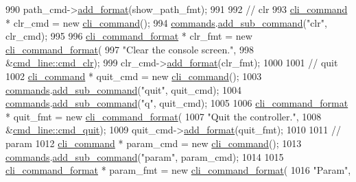 \begin{DoxyCode}
990     path\_cmd->\hyperlink{classcli__command_aa9ec38e761644d946f8db2b920e39921}{add\_format}(show\_path\_fmt);
991 
992     \textcolor{comment}{// clr}
993     \hyperlink{classcli__command}{cli\_command} * clr\_cmd = \textcolor{keyword}{new} \hyperlink{classcli__command}{cli\_command}();
994     \hyperlink{classcmd__line_ae4fea670c2fdd2b60f7b5b6ad6fbaf1e}{commands}.\hyperlink{classcli__command_aa73a67e8ebb6facd4b40ced66279b226}{add\_sub\_command}(\textcolor{stringliteral}{"clr"}, clr\_cmd);
995 
996     \hyperlink{classcli__command__format}{cli\_command\_format} * clr\_fmt = \textcolor{keyword}{new} \hyperlink{classcli__command__format}{cli\_command\_format}(
997         \textcolor{stringliteral}{"Clear the console screen."},
998         &\hyperlink{classcmd__line_a1746d131e0b1e5c83ea12263d2ec673c}{cmd\_line::cmd\_clr});
999     clr\_cmd->\hyperlink{classcli__command_aa9ec38e761644d946f8db2b920e39921}{add\_format}(clr\_fmt);
1000 
1001     \textcolor{comment}{// quit}
1002     \hyperlink{classcli__command}{cli\_command} * quit\_cmd = \textcolor{keyword}{new} \hyperlink{classcli__command}{cli\_command}();
1003     \hyperlink{classcmd__line_ae4fea670c2fdd2b60f7b5b6ad6fbaf1e}{commands}.\hyperlink{classcli__command_aa73a67e8ebb6facd4b40ced66279b226}{add\_sub\_command}(\textcolor{stringliteral}{"quit"}, quit\_cmd);
1004     \hyperlink{classcmd__line_ae4fea670c2fdd2b60f7b5b6ad6fbaf1e}{commands}.\hyperlink{classcli__command_aa73a67e8ebb6facd4b40ced66279b226}{add\_sub\_command}(\textcolor{stringliteral}{"q"}, quit\_cmd);
1005 
1006     \hyperlink{classcli__command__format}{cli\_command\_format} * quit\_fmt = \textcolor{keyword}{new} \hyperlink{classcli__command__format}{cli\_command\_format}(
1007         \textcolor{stringliteral}{"Quit the controller."},
1008         &\hyperlink{classcmd__line_accdc4c3a6107782d913d315e52716aee}{cmd\_line::cmd\_quit});
1009     quit\_cmd->\hyperlink{classcli__command_aa9ec38e761644d946f8db2b920e39921}{add\_format}(quit\_fmt);
1010 
1011     \textcolor{comment}{// param}
1012     \hyperlink{classcli__command}{cli\_command} * param\_cmd = \textcolor{keyword}{new} \hyperlink{classcli__command}{cli\_command}();
1013     \hyperlink{classcmd__line_ae4fea670c2fdd2b60f7b5b6ad6fbaf1e}{commands}.\hyperlink{classcli__command_aa73a67e8ebb6facd4b40ced66279b226}{add\_sub\_command}(\textcolor{stringliteral}{"param"}, param\_cmd);
1014 
1015     \hyperlink{classcli__command__format}{cli\_command\_format} * param\_fmt = \textcolor{keyword}{new} \hyperlink{classcli__command__format}{cli\_command\_format}(
1016         \textcolor{stringliteral}{"Param"},

\end{DoxyCode}
